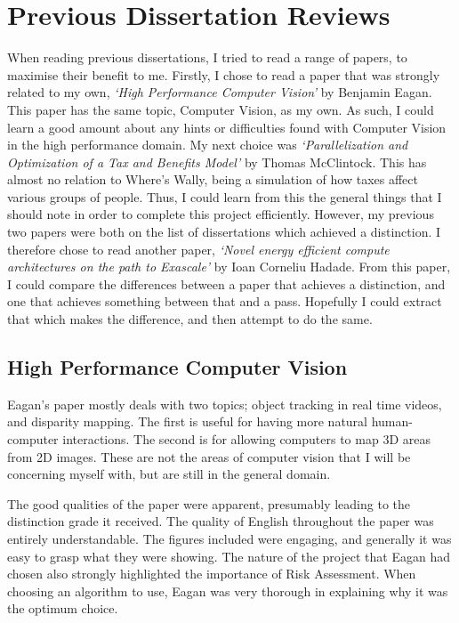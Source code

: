 \section{Previous Dissertation Reviews}
  When reading previous dissertations, I tried to read a range of papers, to maximise their benefit to me.
  Firstly, I chose to read a paper that was strongly related to my own, \emph{`High Performance Computer Vision'} by Benjamin Eagan.
  This paper has the same topic,  Computer Vision, as my own.
  As such, I could learn a good amount about any hints or difficulties found with Computer Vision in the high performance domain.
  My next choice was \emph{`Parallelization and Optimization of a Tax and Benefits Model'} by Thomas McClintock. 
  This has almost no relation to Where's Wally, being a simulation of how taxes affect various groups of people.
  Thus, I could learn from this the general things that I should note in order to complete this project efficiently.
  However, my previous two papers were both on the list of dissertations which achieved a distinction.
  I therefore chose to read another paper, \emph{`Novel energy efficient compute architectures on the path to Exascale'} by Ioan Corneliu Hadade.
  From this paper, I could compare the differences between a paper that achieves a distinction, and one that achieves something between that and a pass.
  Hopefully I could extract that which makes the difference, and then attempt to do the same.
\subsection{High Performance Computer Vision}
  Eagan's paper mostly deals with two topics; object tracking in real time videos, and disparity mapping.
  The first is useful for having more natural human-computer interactions.
  The second is for allowing computers to map 3D areas from 2D images.
  These are not the areas of computer vision that I will be concerning myself with, but are still in the general domain.
  
  The good qualities of the paper were apparent, presumably leading to the distinction grade it received.
  The quality of English throughout the paper was entirely understandable.
  The figures included were engaging, and generally it was easy to grasp what they were showing.
  The nature of the project that Eagan had chosen also strongly highlighted the importance of Risk Assessment.
  When choosing an algorithm to use, Eagan was very thorough in explaining why it was the optimum choice.

